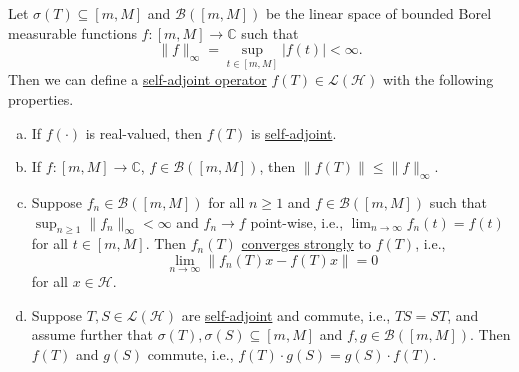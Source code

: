 \begin{theorem}\label{thm:Borel-functional-calculus}
	Let \(\sigma (T) \subseteq [m, M]\) and \(\mathcal{B} ([m, M])\) be the linear space of bounded Borel measurable functions \(f\colon [m, M] \to\mathbb{C}  \) such that
	\[
		\lVert f \rVert _\infty = \sup _{t\in[m, M]} \vert f(t) \vert  < \infty.
	\]
	Then we can define a \hyperref[def:self-adjoint-op]{self-adjoint operator} \(f(T)\in \mathcal{L} (\mathcal{H} )\) with the following properties.
	\begin{enumerate}[(a)]
		\item If \(f(\cdot)\) is real-valued, then \(f(T)\) is \hyperref[def:self-adjoint-op]{self-adjoint}.
		\item If \(f\colon [m, M] \to \mathbb{C} \), \(f\in \mathcal{B} ([m, M])\), then \(\lVert f(T) \rVert \leq \lVert f \rVert _\infty \).
		\item Suppose \(f_n \in \mathcal{B} ([m, M])\) for all \(n\geq 1\) and \(f\in \mathcal{B} ([m, M])\) such that \(\sup _{n\geq 1}\lVert f_n \rVert _\infty < \infty \) and \(f_n \to f\) point-wise, i.e., \(\lim_{n \to \infty} f_n(t) = f(t)\) for all \(t\in [m, M]\). Then \(f_n(T)\) \hyperref[def:strongly-convergence]{converges strongly} to \(f(T)\), i.e.,
		      \[
			      \lim_{n \to \infty} \lVert f_n(T) x - f(T) x \rVert = 0
		      \]
		      for all \(x\in \mathcal{H} \).
		\item Suppose \(T, S \in \mathcal{L} (\mathcal{H} )\) are \hyperref[def:self-adjoint-op]{self-adjoint} and commute, i.e., \(TS = ST\), and assume further that \(\sigma (T), \sigma (S) \subseteq [m, M]\) and \(f, g\in \mathcal{B} ([m, M])\). Then \(f(T)\) and \(g(S)\) commute, i.e., \(f(T) \cdot g(S) = g(S) \cdot f(T)\).
	\end{enumerate}
\end{theorem}